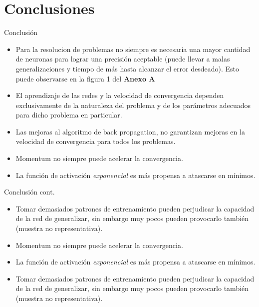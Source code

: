 \documentclass{beamer}
\begin{document}
\section{Conclusiones}
\begin{frame}{Conclusión}

\begin{itemize}
\item Para la resolucion de problemas no siempre es necesaria una mayor cantidad de neuronas para 
lograr una precisión aceptable (puede llevar a malas generalizaciones y tiempo de más 
hasta alcanzar el error desdeado). Esto puede observarse en la figura 1 del \textbf{Anexo A}\\
\item El aprendizaje de las redes y la velocidad de convergencia dependen exclusivamente de la naturaleza del problema 
y de los parámetros adecuados para dicho problema en particular.\\
\item Las mejoras al algoritmo de back propagation, no garantizan mejoras en la velocidad de convergencia para 
todos los problemas.\\
\item Momentum no siempre puede acelerar la convergencia.\\
\item La función de activación \textit{exponencial} es más propensa a atascarse en mínimos.
\end{itemize}

\end{frame}

\begin{frame}{Conclusión cont.}
\begin{itemize}

\item Tomar demasiados patrones de entrenamiento pueden perjudicar la capacidad de la red de generalizar, 
sin embargo muy pocos pueden provocarlo también (muestra no representativa).\\
\item Momentum no siempre puede acelerar la convergencia.\\
\item La función de activación \textit{exponencial} es más propensa a atascarse en mínimos.
\item Tomar demasiados patrones de entrenamiento pueden perjudicar la capacidad de la red de generalizar, 
sin embargo muy pocos pueden provocarlo también (muestra no representativa).\\
\end{itemize}
\end{frame}
\end{document}
